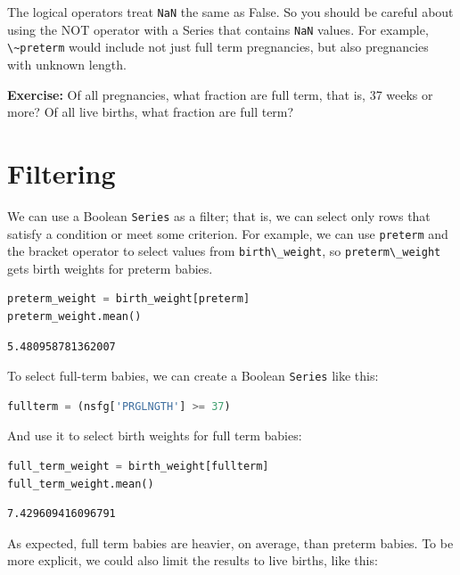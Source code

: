 The logical operators treat \passthrough{\lstinline!NaN!} the same as
False. So you should be careful about using the NOT operator with a
Series that contains \passthrough{\lstinline!NaN!} values. For example,
\passthrough{\lstinline!\~preterm!} would include not just full term
pregnancies, but also pregnancies with unknown length.

\textbf{Exercise:} Of all pregnancies, what fraction are full term, that
is, 37 weeks or more? Of all live births, what fraction are full term?

\hypertarget{filtering}{%
\section{Filtering}\label{filtering}}

We can use a Boolean \passthrough{\lstinline!Series!} as a filter; that
is, we can select only rows that satisfy a condition or meet some
criterion. For example, we can use \passthrough{\lstinline!preterm!} and
the bracket operator to select values from
\passthrough{\lstinline!birth\_weight!}, so
\passthrough{\lstinline!preterm\_weight!} gets birth weights for preterm
babies.

\begin{lstlisting}[language=Python,style=source]
preterm_weight = birth_weight[preterm]
preterm_weight.mean()
\end{lstlisting}

\begin{lstlisting}[style=output]
5.480958781362007
\end{lstlisting}

To select full-term babies, we can create a Boolean
\passthrough{\lstinline!Series!} like this:

\begin{lstlisting}[language=Python,style=source]
fullterm = (nsfg['PRGLNGTH'] >= 37)
\end{lstlisting}

And use it to select birth weights for full term babies:

\begin{lstlisting}[language=Python,style=source]
full_term_weight = birth_weight[fullterm]
full_term_weight.mean()
\end{lstlisting}

\begin{lstlisting}[style=output]
7.429609416096791
\end{lstlisting}

As expected, full term babies are heavier, on average, than preterm
babies. To be more explicit, we could also limit the results to live
births, like this:

